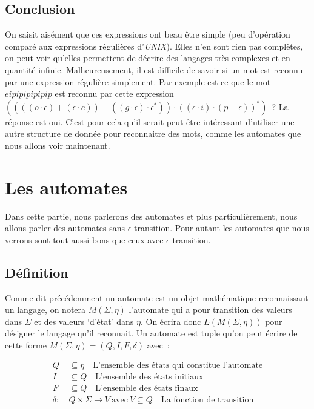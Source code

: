 \documentclass[12pt]{article}
\begin{document}
\subsection{Conclusion}

On saisit aisément que ces expressions ont beau être simple (peu d'opération
comparé aux expressions régulières d'\textit{UNIX}). Elles n'en sont rien pas
complètes, on peut voir qu'elles permettent de décrire des langages très
complexes et en quantité infinie. Malheureusement, il est difficile de savoir
si un mot est reconnu par une expression régulière simplement. Par exemple
est-ce-que le mot \(eipipipipipip\) est reconnu par cette expression \(((((o
\cdot \epsilon)+(\epsilon \cdot e))+((g\cdot \epsilon) \cdot \epsilon^*)) \cdot
((\epsilon \cdot i)\cdot (p+\epsilon))^*)\)~? La réponse est oui. C'est pour
cela qu'il serait peut-être intéressant d'utiliser une autre structure de
donnée pour reconnaitre des mots, comme les automates que nous allons voir
maintenant.

\section{Les automates}

Dans cette partie, nous parlerons des automates et plus particulièrement, nous
allons parler des automates sans \(\epsilon\) transition. Pour autant les
automates que nous verrons sont tout aussi bons que ceux avec \(\epsilon\)
transition.

\subsection{Définition}

Comme dit précédemment un automate est un objet mathématique reconnaissant un
langage, on notera \(M(\Sigma, \eta)\) l'automate qui a pour transition des
valeurs dans \(\Sigma\) et des valeurs `d'état' dans \(\eta\). On écrira donc
\(L(M(\Sigma, \eta))\) pour désigner le langage qu'il reconnait. Un automate
est tuple qu'on peut écrire de cette forme \(M(\Sigma, \eta) = (Q, I, F,
\delta)\) avec~:

\begin{align}
    Q        & \subseteq \eta \quad \text{L'ensemble des états qui constitue l'automate}                \\
    I        & \subseteq Q \quad \text{L'ensemble des états initiaux}                                   \\
    F        & \subseteq Q \quad \text{L'ensemble des états finaux}                                     \\
    \delta:~ & Q \times \Sigma \to V ~\text{avec}~ V \subseteq Q \quad \text{La fonction de transition}
\end{align}
\end{document}
